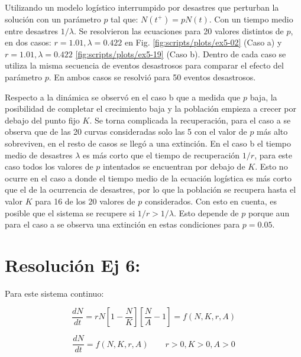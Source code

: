 \documentclass[twocolumn,aps,prl]{revtex4-1}
\begin{document}
Utilizando un modelo logístico interrumpido por desastres que perturban la solución con un parámetro $p$ tal que: $N(t^+)=pN(t)$. Con un tiempo medio entre desastres $1/\lambda$. Se resolvieron las ecuaciones para 20 valores distintos de $p$, en dos casos: $r = \text{1.01}, \lambda = \text{0.422}$ en Fig. \ref{fig:scripts/plots/ex5-02} (Caso a) y $r = \text{1.01}, \lambda = \text{0.422}$ \ref{fig:scripts/plots/ex5-19} (Caso b). Dentro de cada caso se utiliza la misma secuencia de eventos desastrosos para comparar el efecto del parámetro $p$. En ambos casos se resolvió para 50 eventos desastrosos. 

Respecto a la dinámica se observó en el caso b que a medida que $p$ baja, la posibilidad de completar el crecimiento baja y la población empieza a crecer por debajo del punto fijo $K$. Se torna complicada la recuperación, para el caso a se observa que de las 20 curvas consideradas solo las 5 con el valor de $p$ más alto sobreviven, en el resto de casos se llegó a una extinción. 
En el caso b el tiempo medio de desastres $\lambda$ es más corto que el tiempo de recuperación $1/r$, para este caso todos los valores de $p$ intentados se encuentran por debajo de $K$. Esto no ocurre en el caso a donde el tiempo medio de la ecuación logística es más corto que el de la ocurrencia de desastres, por lo que la población se recupera hasta el valor $K$ para 16 de los 20 valores de $p$ considerados. Con esto en cuenta, es posible que el sistema se recupere si $1/r > 1/\lambda$. Esto depende de $p$ porque aun para el caso a se observa una extinción en estas condiciones para $p =\text{0.05}$.

% 
%                              
% 

\section{Resolución Ej 6:}

Para este sistema continuo:

\begin{equation}\label{eqn:Alle}
\frac{d N}{d t} =r N\left[1-\frac{N}{K}\right]\left[\frac{N}{A}-1\right] = f(N, K, r, A)
\end{equation}

$$
\frac{d N}{d t} = f(N, K, r, A) \qquad r>0, K>0 , A>0
$$
\end{document}
